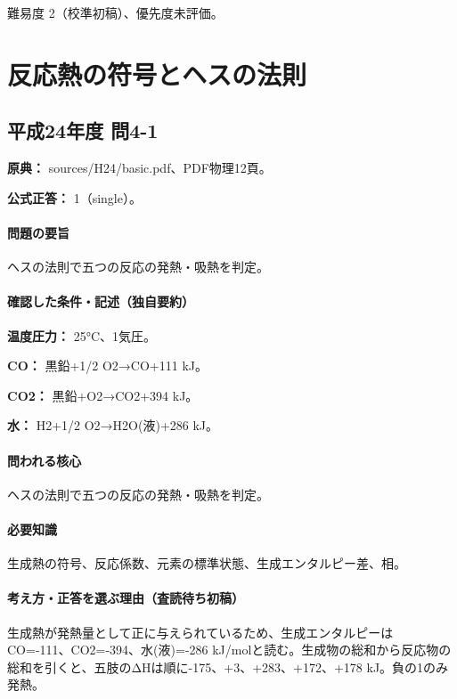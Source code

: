 \par 難易度 2（校準初稿）、優先度未評価。

\section{反応熱の符号とヘスの法則}

\subsection{平成24年度 問4-1}
\label{q:h24-reg-basic-4-1}

\noindent\textbf{原典：} sources/H24/basic.pdf、PDF物理12頁。

\textbf{公式正答：} 1（single）。

\paragraph{問題の要旨} ヘスの法則で五つの反応の発熱・吸熱を判定。

\paragraph{確認した条件・記述（独自要約）}\mbox{}\par

\noindent\textbf{温度圧力：} 25°C、1気圧。\par

\noindent\textbf{CO：} 黒鉛+1/2 O2→CO+111 kJ。\par

\noindent\textbf{CO2：} 黒鉛+O2→CO2+394 kJ。\par

\noindent\textbf{水：} H2+1/2 O2→H2O(液)+286 kJ。\par

\paragraph{問われる核心} ヘスの法則で五つの反応の発熱・吸熱を判定。

\paragraph{必要知識} 生成熱の符号、反応係数、元素の標準状態、生成エンタルピー差、相。

\paragraph{考え方・正答を選ぶ理由（査読待ち初稿）} 生成熱が発熱量として正に与えられているため、生成エンタルピーはCO=-111、CO2=-394、水(液)=-286 kJ/molと読む。生成物の総和から反応物の総和を引くと、五肢のΔHは順に-175、+3、+283、+172、+178 kJ。負の1のみ発熱。

